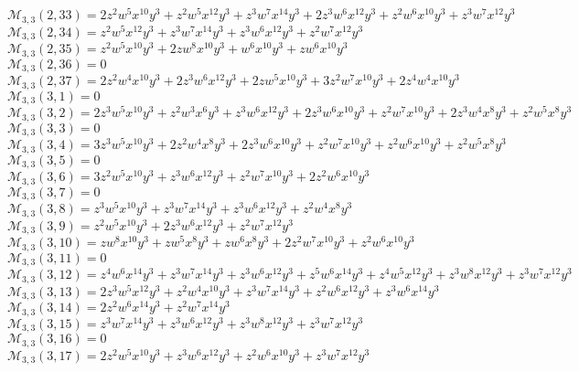 \documentclass[12pt]{memoireuqam1.3}
\begin{document}
$\mathcal{M}_{3,3}(2,33)=2z^2w^5x^{10}y^3+z^2w^5x^{12}y^3+z^3w^7x^{14}y^3+2z^3w^6x^{12}y^3+z^2w^6x^{10}y^3+z^3w^7x^{12}y^3$\\
$\mathcal{M}_{3,3}(2,34)=z^2w^5x^{12}y^3+z^3w^7x^{14}y^3+z^3w^6x^{12}y^3+z^2w^7x^{12}y^3$\\
$\mathcal{M}_{3,3}(2,35)=z^2w^5x^{10}y^3+2zw^8x^{10}y^3+w^6x^{10}y^3+zw^6x^{10}y^3$\\
$\mathcal{M}_{3,3}(2,36)=0$\\
$\mathcal{M}_{3,3}(2,37)=2z^2w^4x^{10}y^3+2z^3w^6x^{12}y^3+2zw^5x^{10}y^3+3z^2w^7x^{10}y^3+2z^4w^4x^{10}y^3$\\
$\mathcal{M}_{3,3}(3,1)=0$\\
$\mathcal{M}_{3,3}(3,2)=2z^3w^5x^{10}y^3+z^2w^3x^6y^3+z^3w^6x^{12}y^3+2z^3w^6x^{10}y^3+z^2w^7x^{10}y^3+2z^3w^4x^8y^3+z^2w^5x^8y^3$\\
$\mathcal{M}_{3,3}(3,3)=0$\\
$\mathcal{M}_{3,3}(3,4)=3z^3w^5x^{10}y^3+2z^2w^4x^8y^3+2z^3w^6x^{10}y^3+z^2w^7x^{10}y^3+z^2w^6x^{10}y^3+z^2w^5x^8y^3$\\
$\mathcal{M}_{3,3}(3,5)=0$\\
$\mathcal{M}_{3,3}(3,6)=3z^2w^5x^{10}y^3+z^3w^6x^{12}y^3+z^2w^7x^{10}y^3+2z^2w^6x^{10}y^3$\\
$\mathcal{M}_{3,3}(3,7)=0$\\
$\mathcal{M}_{3,3}(3,8)=z^3w^5x^{10}y^3+z^3w^7x^{14}y^3+z^3w^6x^{12}y^3+z^2w^4x^8y^3$\\
$\mathcal{M}_{3,3}(3,9)=z^2w^5x^{10}y^3+2z^3w^6x^{12}y^3+z^2w^7x^{12}y^3$\\
$\mathcal{M}_{3,3}(3,10)=zw^8x^{10}y^3+zw^5x^8y^3+zw^6x^8y^3+2z^2w^7x^{10}y^3+z^2w^6x^{10}y^3$\\
$\mathcal{M}_{3,3}(3,11)=0$\\
$\mathcal{M}_{3,3}(3,12)=z^4w^6x^{14}y^3+z^3w^7x^{14}y^3+z^3w^6x^{12}y^3+z^5w^6x^{14}y^3+z^4w^5x^{12}y^3+z^3w^8x^{12}y^3+z^3w^7x^{12}y^3$\\
$\mathcal{M}_{3,3}(3,13)=2z^3w^5x^{12}y^3+z^2w^4x^{10}y^3+z^3w^7x^{14}y^3+z^2w^6x^{12}y^3+z^3w^6x^{14}y^3$\\
$\mathcal{M}_{3,3}(3,14)=2z^2w^6x^{14}y^3+z^2w^7x^{14}y^3$\\
$\mathcal{M}_{3,3}(3,15)=z^3w^7x^{14}y^3+z^3w^6x^{12}y^3+z^3w^8x^{12}y^3+z^3w^7x^{12}y^3$\\
$\mathcal{M}_{3,3}(3,16)=0$\\
$\mathcal{M}_{3,3}(3,17)=2z^2w^5x^{10}y^3+z^3w^6x^{12}y^3+z^2w^6x^{10}y^3+z^3w^7x^{12}y^3$\\
\end{document}
